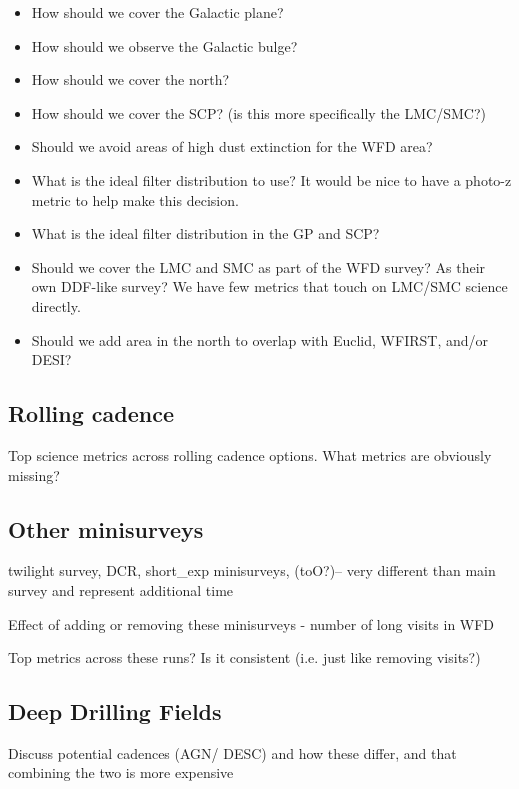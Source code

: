 \begin{itemize}
    \item{How should we cover the Galactic plane?}
    \item{How should we observe the Galactic bulge?}
    \item{How should we cover the north?}
    \item{How should we cover the SCP? (is this more specifically the LMC/SMC?)}
    \item{Should we avoid areas of high dust extinction for the WFD area?}
    \item{What is the ideal filter distribution to use? It would be nice to have a photo-z metric to help make this decision.}
    \item{What is the ideal filter distribution in the GP and SCP?}
    \item{Should we cover the LMC and SMC as part of the WFD survey? As their own DDF-like survey? We have few metrics that touch on LMC/SMC science directly.}
    \item{Should we add area in the north to overlap with Euclid, WFIRST, and/or DESI?}
\end{itemize}


\subsection{Rolling cadence}

Top science metrics across rolling cadence options. 
What metrics are obviously missing?


\subsection{Other minisurveys}

twilight survey, DCR, short\_exp minisurveys, (toO?)-- very different than main survey and represent additional time

Effect of adding or removing these minisurveys - number of long visits in WFD



Top metrics across these runs? Is it consistent (i.e. just like removing visits?)


\subsection{Deep Drilling Fields}


Discuss potential cadences (AGN/ DESC) and how these differ, and that combining the two is more expensive


